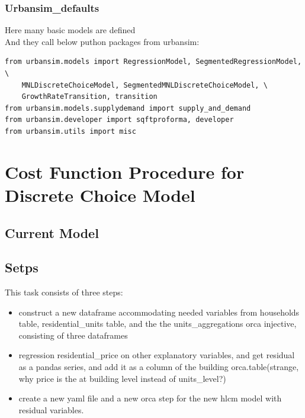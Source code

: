 \documentclass{article}\usepackage[]{graphicx}\usepackage[]{color}
\begin{document}
\subsubsection{Urbansim\_defaults}
Here many basic models are defined\\
And they call below puthon packages from urbansim:\\
\begin{lstlisting}
from urbansim.models import RegressionModel, SegmentedRegressionModel, \
    MNLDiscreteChoiceModel, SegmentedMNLDiscreteChoiceModel, \
    GrowthRateTransition, transition
from urbansim.models.supplydemand import supply_and_demand
from urbansim.developer import sqftproforma, developer
from urbansim.utils import misc
\end{lstlisting}





\section{Cost Function Procedure for Discrete Choice Model}

\subsection{Current Model}

\subsection{Setps}


This task consists of three steps:\\

\begin{itemize}
\item{construct a new dataframe accommodating needed variables from households table, residential\_units table, and the the units\_aggregations orca injective, consisting of three dataframes}
\item{regression residential\_price on other explanatory variables, and get residual as a pandas series, and add it as a column of the building orca.table(strange, why price is the at building level instead of units\_level?)}
\item{create a new yaml file and a new orca step for the new hlcm model with residual variables.}
\end{itemize}



\vsapce{20cm}
\end{document}
